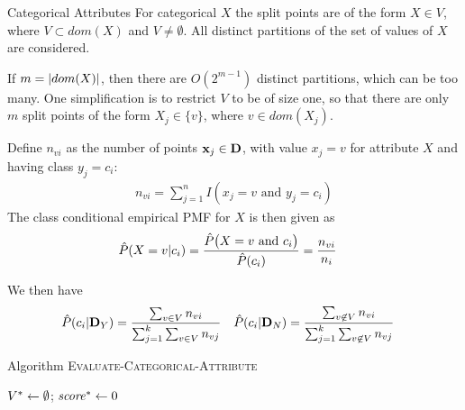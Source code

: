 \begin{frame}{Categorical Attributes}
  \small
For categorical $X$ the split points are of 
the form $X \in V$, where $V \subset dom(X)$ and $V
\ne \emptyset$. All distinct partitions of the set of
values of $X$ are considered.

\medskip
If $m = |dom(X)|$, then there are $O(2^{m-1})$ distinct
partitions, which can be too many.
One simplif\/{i}cation is to restrict $V$ to be of size one, so
that there are only $m$ split points of the form $X_{j} \in \{v\}$,
where $v \in dom(X_{j})$.

\medskip
Def\/{i}ne $n_{vi}$ as the number of points $\mathbf{x}_{j} \in \mathbf{D}$, with
value $x_{j}=v$ for attribute $X$ and having class $y_{j}=c_i$:
\begin{align*}
  n_{vi} = \sum_{j=1}^n I(x_{j} = v \mbox{ and } y_{j}=c_i)
\end{align*}
The class conditional empirical PMF for $X$ is then given as
\begin{align*}
    \hat{P}(X=v|c_i) & =
    {\hat{P}\bigl(X = v \text{ and } c_i\bigr) \over \hat{P}(c_i)}
   = {n_{vi} \over n_i}
\end{align*}

\medskip
We then have
\begin{align*}
    \hat{P}(c_i|\mathbf{D}_Y) &
    = \frac{\sum_{v \in V} n_{vi}}
    {\sum_{j=1}^k \sum_{v \in V} n_{vj}} &
    \hat{P}(c_i|\mathbf{D}_N) &
    = \frac{\sum_{v \not\in V} n_{vi}}
    {\sum_{j=1}^k \sum_{v \not\in V} n_{vj}}
\end{align*}
\end{frame}


\begin{frame}[fragile]{Algorithm \textsc{Evaluate-Categorical-Attribute}}
\begin{algorithm}[H]
  \small
    \Algorithm{}
    $V^* \leftarrow \emptyset$; $\mathit{score}^* \leftarrow 0$ 
\end{algorithm}
\end{frame}



